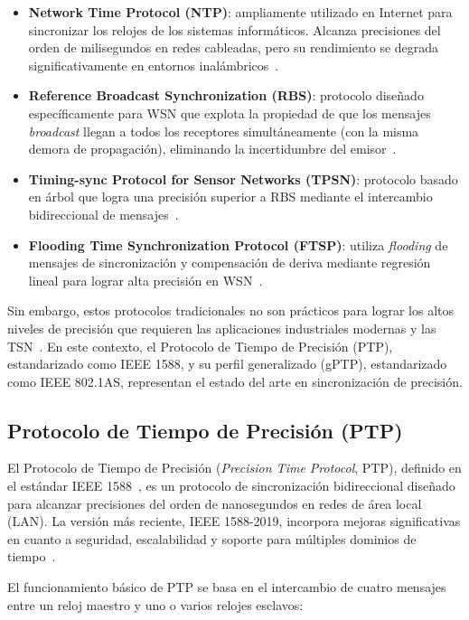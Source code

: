 \begin{itemize}
\item \textbf{Network Time Protocol (NTP)}: ampliamente utilizado en Internet para sincronizar los relojes de los sistemas informáticos. Alcanza precisiones del orden de milisegundos en redes cableadas, pero su rendimiento se degrada significativamente en entornos inalámbricos~\cite{krummacker2020}.
\item \textbf{Reference Broadcast Synchronization (RBS)}: protocolo diseñado específicamente para WSN que explota la propiedad de que los mensajes \textit{broadcast} llegan a todos los receptores simultáneamente (con la misma demora de propagación), eliminando la incertidumbre del emisor~\cite{lasassmeh2010}.
\item \textbf{Timing-sync Protocol for Sensor Networks (TPSN)}: protocolo basado en árbol que logra una precisión superior a RBS mediante el intercambio bidireccional de mensajes~\cite{lasassmeh2010}.
\item \textbf{Flooding Time Synchronization Protocol (FTSP)}: utiliza \textit{flooding} de mensajes de sincronización y compensación de deriva mediante regresión lineal para lograr alta precisión en WSN~\cite{swain2015}.
\end{itemize}

Sin embargo, estos protocolos tradicionales no son prácticos para lograr los altos niveles de precisión que requieren las aplicaciones industriales modernas y las TSN~\cite{lasassmeh2010}. En este contexto, el Protocolo de Tiempo de Precisión (PTP), estandarizado como IEEE 1588, y su perfil generalizado (gPTP), estandarizado como IEEE 802.1AS, representan el estado del arte en sincronización de precisión.

\subsection{Protocolo de Tiempo de Precisión (PTP)}
\label{sec:1.5.1}

El Protocolo de Tiempo de Precisión (\textit{Precision Time Protocol}, PTP), definido en el estándar IEEE 1588~\cite{ieee1588_2019}, es un protocolo de sincronización bidireccional diseñado para alcanzar precisiones del orden de nanosegundos en redes de área local (LAN). La versión más reciente, IEEE 1588-2019, incorpora mejoras significativas en cuanto a seguridad, escalabilidad y soporte para múltiples dominios de tiempo~\cite{ieee1588_2019}.

El funcionamiento básico de PTP se basa en el intercambio de cuatro mensajes entre un reloj maestro y uno o varios relojes esclavos:

